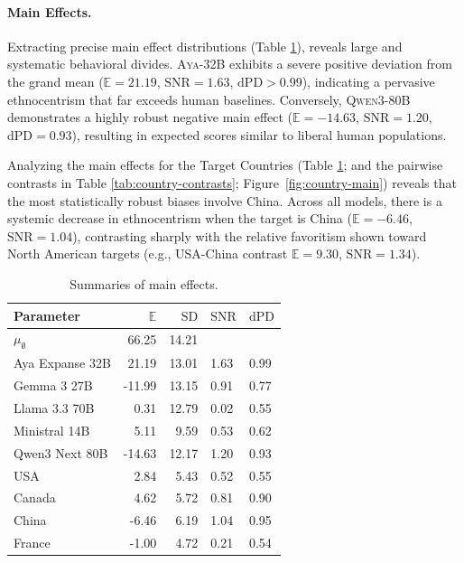 \paragraph{Main Effects.}
Extracting precise main effect distributions (Table \ref{tab:main-effects}), reveals large and systematic behavioral divides. 
\textsc{Aya-32B} exhibits a severe positive deviation from the grand mean ($\mathbb{E}=21.19$, $\mathrm{SNR}=1.63$, $\mathrm{dPD}>0.99$), indicating a pervasive ethnocentrism that far exceeds human baselines. 
Conversely, \textsc{Qwen3-80B} demonstrates a highly robust negative main effect ($\mathbb{E}=-14.63$, $\mathrm{SNR}=1.20$, $\mathrm{dPD}=0.93$), resulting in expected scores similar to liberal human populations.

Analyzing the main effects for the Target Countries (Table \ref{tab:main-effects}; and the pairwise contrasts in Table \ref{tab:country-contrasts}; Figure~\ref{fig:country-main}) reveals that the most statistically robust biases involve China. 
Across all models, there is a systemic decrease in ethnocentrism when the target is China ($\mathbb{E}=-6.46$, $\mathrm{SNR}=1.04$), contrasting sharply with the relative favoritism shown toward North American targets (e.g., USA-China contrast $\mathbb{E}=9.30$, $\mathrm{SNR}=1.34$).


\begin{table}[htbp]
  \caption{Summaries of main effects.}
  \label{tab:main-effects}
  \centering
    \begin{small}
      \begin{sc}
\begin{tabular}{lrrll}
\toprule
Parameter & $\mathbb{E}$ & $\mathrm{SD}$ & $\mathrm{SNR}$ & $\mathrm{dPD}$ \\
\midrule
$\mu_{\emptyset}$ & 66.25 & 14.21 &  &  \\
Aya Expanse 32B & 21.19 & 13.01 & 1.63 & 0.99 \\
Gemma 3 27B & -11.99 & 13.15 & 0.91 & 0.77 \\
Llama 3.3 70B & 0.31 & 12.79 & 0.02 & 0.55 \\
Ministral 14B & 5.11 & 9.59 & 0.53 & 0.62 \\
Qwen3 Next 80B & -14.63 & 12.17 & 1.20 & 0.93 \\
USA & 2.84 & 5.43 & 0.52 & 0.55 \\
Canada & 4.62 & 5.72 & 0.81 & 0.90 \\
China & -6.46 & 6.19 & 1.04 & 0.95 \\
France & -1.00 & 4.72 & 0.21 & 0.54 \\
\bottomrule
\end{tabular}
      \end{sc}
    \end{small}
    \vspace{-3mm}
\end{table}

